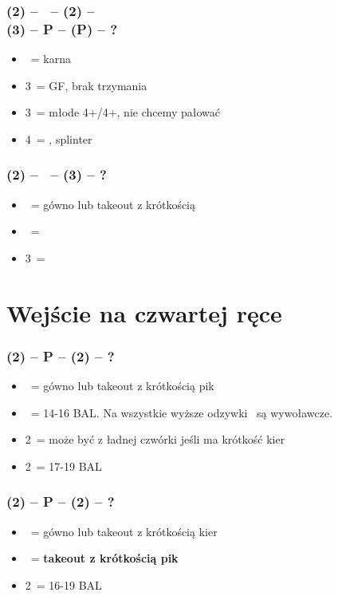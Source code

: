 \documentclass[12pt, a4paper]{article}
\begin{document}
\subsubsection*{(2\diams) -- \dbl\ -- (2\spades) -- \dbl \\ (3\hearts) -- P -- (P) -- ?}
\begin{itemize}
    \item \dbl\ = karna
    \item 3\spades\ = GF, brak trzymania \hearts
    \item 3\nt\ = młode 4+/4+, nie chcemy pałować
    \item 4\hearts\ = \gf, splinter \hearts
\end{itemize}

\subsubsection*{(2\diams) -- \dbl\ -- (3\hearts) -- ?}
\begin{itemize}
    \item \pass\ = gówno lub takeout z krótkością \spades
    \item \dbl\ = \gf\
    \item 3\spades\ = \gf
\end{itemize}



\pagebreak
\section{Wejście na czwartej ręce}

\subsubsection*{(2\diams) -- P -- (2\hearts) -- ?}
\begin{itemize}
    \item \pass\ = gówno lub takeout z krótkością pik
    \item \dbl\ = 14-16 BAL. Na wszystkie wyższe odzywki \dbl\ są wywoławcze.
    \item 2\spades\ = może być z ładnej czwórki jeśli ma krótkość kier
    \item 2\nt\ = 17-19 BAL
\end{itemize}


\subsubsection*{(2\diams) -- P -- (2\spades) -- ?}
\begin{itemize}
    \item \pass\ = gówno lub takeout z krótkością kier
    \item \dbl\ = \textbf{takeout z krótkością pik} \imp
    \item 2\nt\ = 16-19 BAL \imp
\end{itemize}
\end{document}
